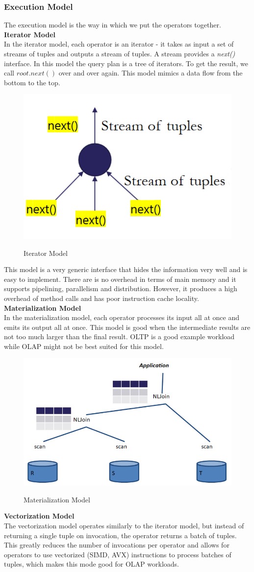 \subsubsection{Execution Model}
The execution model is the way in which we put the operators together.\vspace{.3cm}\\
\textbf{Iterator Model}\\
In the iterator model, each operator is an iterator - it takes as input a set of streams of tuples and outputs a stream of tuples. A stream provides a \textit{next()} interface. In this model the query plan is a tree of iterators. To get the result, we call $root.next()$ over and over again. This model mimics a data flow from the bottom to the top.
\begin{figure}[H]
\centering
\includegraphics[width=.5\textwidth]{images/iterator.PNG}
\label{iterator}
\caption{Iterator Model}
\end{figure}
This model is a very generic interface that hides the information very well and is easy to implement. There are is no overhead in terms of main memory and it supports pipelining, parallelism and distribution. However, it produces a high overhead of method calls and has poor instruction cache locality.\vspace{.3cm}\\
\textbf{Materialization Model}\\
In the materialization model, each operator processes its input all at once and emits its output all at once. This model is good when the intermediate results are not too much larger than the final result. OLTP is a good example workload while OLAP might not be best suited for this model.
\begin{figure}[H]
\centering
\includegraphics[width=.5\textwidth]{images/materialization.PNG}
\label{materialization}
\caption{Materialization Model}
\end{figure}
\textbf{Vectorization Model}\\
The vectorization model operates similarly to the iterator model, but instead of returning a single tuple on invocation, the operator returns a batch of tuples. This greatly reduces the number of invocations per operator and allows for operators to use vectorized (SIMD, AVX) instructions to process batches of tuples, which makes this mode good for OLAP workloads.

